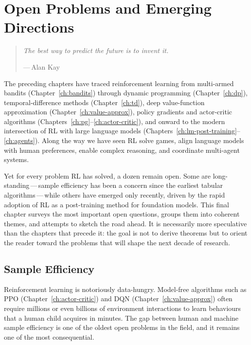 
\chapter{Open Problems and Emerging Directions}
\label{ch:open}

\begin{quote}
\itshape
The best way to predict the future is to invent it.
\par\medskip
\upshape\raggedleft
---\,Alan Kay
\end{quote}

\bigskip

The preceding chapters have traced reinforcement learning from
multi-armed bandits (Chapter~\ref{ch:bandits}) through dynamic
programming (Chapter~\ref{ch:dp}), temporal-difference methods
(Chapter~\ref{ch:td}), deep value-function approximation
(Chapter~\ref{ch:value-approx}), policy gradients and actor-critic
algorithms (Chapters~\ref{ch:pg}--\ref{ch:actor-critic}), and onward
to the modern intersection of RL with large language models
(Chapters~\ref{ch:lm-post-training}--\ref{ch:agents}).  Along the
way we have seen RL solve games, align language models with human
preferences, enable complex reasoning, and coordinate multi-agent
systems.

Yet for every problem RL has solved, a dozen remain open.  Some are
long-standing\,---\,sample efficiency has been a concern since the
earliest tabular algorithms\,---\,while others have emerged only
recently, driven by the rapid adoption of RL as a post-training
method for foundation models.  This final chapter surveys the most
important open questions, groups them into coherent themes, and
attempts to sketch the road ahead.  It is necessarily more speculative
than the chapters that precede it: the goal is not to derive theorems
but to orient the reader toward the problems that will shape the next
decade of research.


\section{Sample Efficiency}
\label{sec:open-sample}

Reinforcement learning is notoriously data-hungry.  Model-free
algorithms such as PPO (Chapter~\ref{ch:actor-critic})
and DQN (Chapter~\ref{ch:value-approx}) often require millions or
even billions of environment interactions to learn behaviours that a
human child acquires in minutes.  The gap between human and machine
sample efficiency is one of the oldest open problems in the field, and
it remains one of the most consequential.


